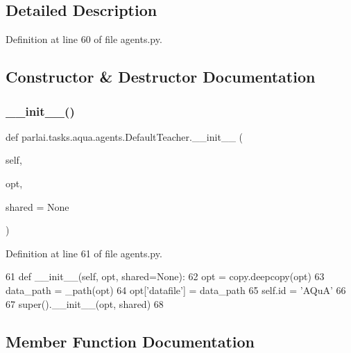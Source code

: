 \subsection{Detailed Description}


Definition at line 60 of file agents.\+py.



\subsection{Constructor \& Destructor Documentation}
\mbox{\label{classparlai_1_1tasks_1_1aqua_1_1agents_1_1DefaultTeacher_a38b4f35f89a9c859e70ed88f1520e5bf}} 
\subsubsection{\texorpdfstring{\+\_\+\+\_\+init\+\_\+\+\_\+()}{\_\_init\_\_()}}
{\footnotesize\ttfamily def parlai.\+tasks.\+aqua.\+agents.\+Default\+Teacher.\+\_\+\+\_\+init\+\_\+\+\_\+ (\begin{DoxyParamCaption}\item[{}]{self,  }\item[{}]{opt,  }\item[{}]{shared = {\ttfamily None} }\end{DoxyParamCaption})}



Definition at line 61 of file agents.\+py.


\begin{DoxyCode}
61     \textcolor{keyword}{def }\_\_init\_\_(self, opt, shared=None):
62         opt = copy.deepcopy(opt)
63         data\_path = \_path(opt)
64         opt[\textcolor{stringliteral}{'datafile'}] = data\_path
65         self.id = \textcolor{stringliteral}{'AQuA'}
66 
67         super().\_\_init\_\_(opt, shared)
68 
\end{DoxyCode}


\subsection{Member Function Documentation}
\mbox{\label{classparlai_1_1tasks_1_1aqua_1_1agents_1_1DefaultTeacher_a928d2d0ad6804660ca863b2221f53b8e}} 
